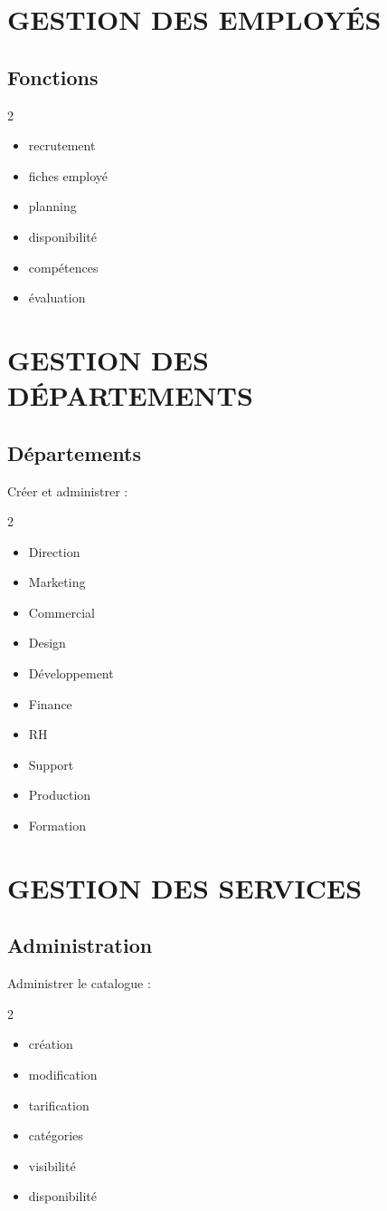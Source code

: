 \documentclass[12pt,a4paper,oneside]{book}
\begin{document}
\chapter{GESTION DES EMPLOYÉS}

\section{Fonctions}
\begin{multicols}{2}
\begin{itemize}
\item recrutement
\item fiches employé
\item planning
\item disponibilité
\item compétences
\item évaluation
\end{itemize}
\end{multicols}

\chapter{GESTION DES DÉPARTEMENTS}

\section{Départements}
Créer et administrer :
\begin{multicols}{2}
\begin{itemize}
\item Direction
\item Marketing
\item Commercial
\item Design
\item Développement
\item Finance
\item RH
\item Support
\item Production
\item Formation
\end{itemize}
\end{multicols}

\chapter{GESTION DES SERVICES}

\section{Administration}
Administrer le catalogue :
\begin{multicols}{2}
\begin{itemize}
\item création
\item modification
\item tarification
\item catégories
\item visibilité
\item disponibilité
\end{itemize}
\end{multicols}
\end{document}
